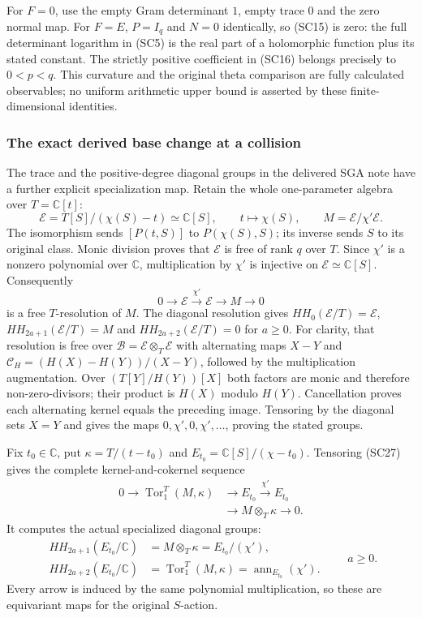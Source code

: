 For $F=0$, use the empty Gram determinant $1$, empty trace $0$
and the zero normal map.  For $F=E$, $P=I_q$ and $N=0$ identically,
so (SC15) is zero: the full determinant logarithm in (SC5) is the
real part of a holomorphic function plus its stated constant.
The strictly positive coefficient in (SC16) belongs precisely to
$0<p<q$.  This curvature and the original theta comparison are
fully calculated observables; no uniform arithmetic upper bound is
asserted by these finite-dimensional identities.

\subsubsection{The exact derived base change at a collision}

The trace and the positive-degree diagonal groups in the delivered
SGA note have a further explicit specialization map.  Retain the
whole one-parameter algebra over $T=\mathbb C[t]$:
\[
 \mathscr E=T[S]/(\chi(S)-t)\simeq\mathbb C[S],
 \qquad t\longmapsto\chi(S),\qquad
 M=\mathscr E/\chi'\mathscr E.
 \tag{SC26}
\]
The isomorphism sends $[P(t,S)]$ to $P(\chi(S),S)$; its inverse
sends $S$ to its original class.  Monic division proves that
$\mathscr E$ is free of rank $q$ over $T$.  Since $\chi'$ is a
nonzero polynomial over $\mathbb C$, multiplication by $\chi'$
is injective on $\mathscr E\simeq\mathbb C[S]$.  Consequently
\[
 0\longrightarrow\mathscr E\xrightarrow{\chi'}\mathscr E
   \longrightarrow M\longrightarrow0
 \tag{SC27}
\]
is a free $T$-resolution of $M$.  The diagonal resolution gives
$HH_0(\mathscr E/T)=\mathscr E$,
$HH_{2a+1}(\mathscr E/T)=M$ and
$HH_{2a+2}(\mathscr E/T)=0$ for $a\geq0$.
For clarity, that resolution is free over
$\mathscr B=\mathscr E\otimes_T\mathscr E$ with alternating maps
$X-Y$ and $\mathcal C_H=(H(X)-H(Y))/(X-Y)$, followed by
the multiplication augmentation.  Over
$(T[Y]/H(Y))[X]$ both factors are monic and therefore
non-zero-divisors; their product is $H(X)$ modulo $H(Y)$.
Cancellation proves each alternating kernel equals the preceding
image.  Tensoring by the diagonal sets $X=Y$ and gives the maps
$0,\chi',0,\chi',\ldots$, proving the stated groups.

Fix $t_0\in\mathbb C$, put $\kappa=T/(t-t_0)$ and
$E_{t_0}=\mathbb C[S]/(\chi-t_0)$.  Tensoring (SC27) gives the
complete kernel-and-cokernel sequence
\[
\begin{split}
0\longrightarrow\operatorname{Tor}_1^T(M,\kappa)
 &\longrightarrow E_{t_0}\xrightarrow{\chi'} E_{t_0}\\
 &\longrightarrow M\otimes_T\kappa\longrightarrow0.
\end{split}\tag{SC28}
\]
It computes the actual specialized diagonal groups:
\[
 \begin{split}
 HH_{2a+1}(E_{t_0}/\mathbb C)&=M\otimes_T\kappa
                              =E_{t_0}/(\chi'),\\
 HH_{2a+2}(E_{t_0}/\mathbb C)&=\operatorname{Tor}_1^T(M,\kappa)
                              =\operatorname{ann}_{E_{t_0}}(\chi').
 \end{split}\qquad a\geq0.
 \tag{SC29}
\]
Every arrow is induced by the same polynomial multiplication,
so these are equivariant maps for the original $S$-action.

